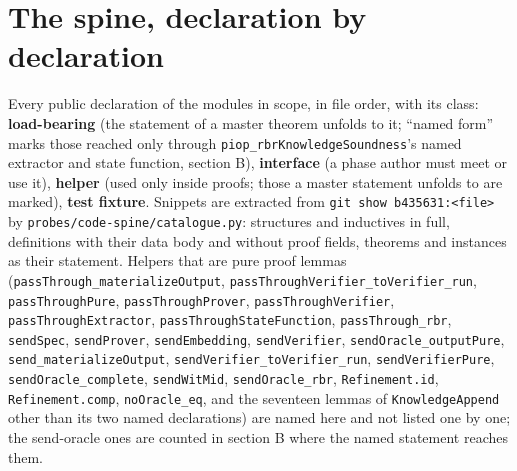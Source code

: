 \section{The spine, declaration by declaration}\label{sec:gen-cat-spine}

Every public declaration of the modules in scope, in file order, with its class: \textbf{load-bearing} (the statement of a master theorem unfolds to it; \enquote{named form} marks those reached only through \texttt{piop\_\allowbreak{}rbrKnowledgeSoundness}'s named extractor and state function, section B), \textbf{interface} (a phase author must meet or use it), \textbf{helper} (used only inside proofs; those a master statement unfolds to are marked), \textbf{test fixture}. Snippets are extracted from \texttt{git show b435631:<file>} by \texttt{p\allowbreak{}r\allowbreak{}o\allowbreak{}b\allowbreak{}e\allowbreak{}s\allowbreak{}/\allowbreak{}c\allowbreak{}o\allowbreak{}d\allowbreak{}e\allowbreak{}-{}\allowbreak{}s\allowbreak{}p\allowbreak{}i\allowbreak{}n\allowbreak{}e\allowbreak{}/\allowbreak{}c\allowbreak{}a\allowbreak{}t\allowbreak{}a\allowbreak{}l\allowbreak{}o\allowbreak{}g\allowbreak{}u\allowbreak{}e\allowbreak{}.\allowbreak{}p\allowbreak{}y}: structures and inductives in full, definitions with their data body and without proof fields, theorems and instances as their statement. Helpers that are pure proof lemmas (\texttt{p\allowbreak{}a\allowbreak{}s\allowbreak{}s\allowbreak{}T\allowbreak{}h\allowbreak{}r\allowbreak{}o\allowbreak{}u\allowbreak{}g\allowbreak{}h\allowbreak{}\_\allowbreak{}m\allowbreak{}a\allowbreak{}t\allowbreak{}e\allowbreak{}r\allowbreak{}i\allowbreak{}a\allowbreak{}l\allowbreak{}i\allowbreak{}z\allowbreak{}e\allowbreak{}O\allowbreak{}u\allowbreak{}t\allowbreak{}p\allowbreak{}u\allowbreak{}t}, \texttt{p\allowbreak{}a\allowbreak{}s\allowbreak{}s\allowbreak{}T\allowbreak{}h\allowbreak{}r\allowbreak{}o\allowbreak{}u\allowbreak{}g\allowbreak{}h\allowbreak{}V\allowbreak{}e\allowbreak{}r\allowbreak{}i\allowbreak{}f\allowbreak{}i\allowbreak{}e\allowbreak{}r\allowbreak{}\_\allowbreak{}t\allowbreak{}o\allowbreak{}V\allowbreak{}e\allowbreak{}r\allowbreak{}i\allowbreak{}f\allowbreak{}i\allowbreak{}e\allowbreak{}r\allowbreak{}\_\allowbreak{}r\allowbreak{}u\allowbreak{}n}, \texttt{passThroughPure}, \texttt{passThroughProver}, \texttt{passThroughVerifier}, \texttt{passThroughExtractor}, \texttt{passThroughStateFunction}, \texttt{passThrough\_\allowbreak{}rbr}, \texttt{sendSpec}, \texttt{sendProver}, \texttt{sendEmbedding}, \texttt{sendVerifier}, \texttt{sendOracle\_\allowbreak{}outputPure}, \texttt{send\_\allowbreak{}materializeOutput}, \texttt{sendVerifier\_\allowbreak{}toVerifier\_\allowbreak{}run}, \texttt{sendVerifierPure}, \texttt{sendOracle\_\allowbreak{}complete}, \texttt{sendWitMid}, \texttt{sendOracle\_\allowbreak{}rbr}, \texttt{Refinement.\allowbreak{}id}, \texttt{Refinement.\allowbreak{}comp}, \texttt{noOracle\_\allowbreak{}eq}, and the seventeen lemmas of \texttt{KnowledgeAppend} other than its two named declarations) are named here and not listed one by one; the send-oracle ones are counted in section B where the named statement reaches them.

